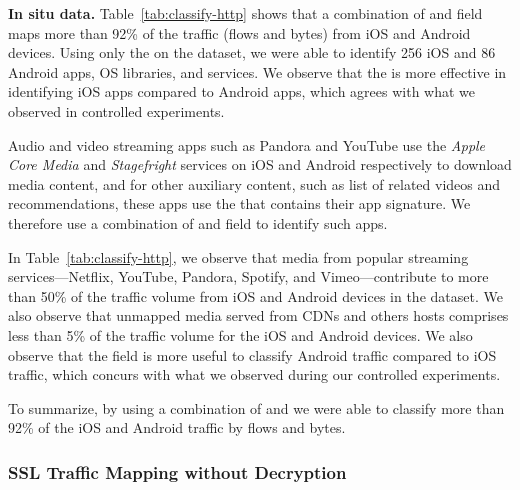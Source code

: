 \textbf{In situ data.}
Table~\ref{tab:classify-http} shows that a combination of \useragent and \httphost field maps more than 92\% of the traffic (flows and bytes) from iOS and Android devices.
Using only the \useragent on the \mobWild dataset, we were able to identify 256 iOS and 86 Android apps, OS libraries, and services. 
We observe that the \useragent is more effective in identifying iOS apps compared to Android apps, which agrees with what we observed in controlled experiments.

Audio and video streaming apps such as Pandora and You\-Tube use the \emph{Apple Core Media} and \emph{Stagefright} services on iOS and Android respectively to download media content, and for other auxiliary content, such as list of related videos and recommendations, these apps use the \useragent that contains their app signature.
We therefore use a combination of \useragent and \httphost field to identify such apps.

In Table~\ref{tab:classify-http}, we observe that media from popular streaming services---Netflix, YouTube, Pandora, Spotify, and Vimeo---contribute to more than 50\% of the traffic volume from iOS and Android devices in the \mobWild dataset.
We also observe that unmapped media served from CDNs and others hosts comprises less than 5\% of the traffic volume for the iOS and Android devices. 
We also observe that the \httphost field is more useful to classify Android traffic compared to iOS traffic, which concurs with what we observed during our controlled experiments. 

To summarize, by using a combination of \useragent and \httphost we were able to classify more than 92\% of the iOS and Android traffic by flows and bytes. 

\subsubsection{SSL Traffic Mapping without Decryption}

